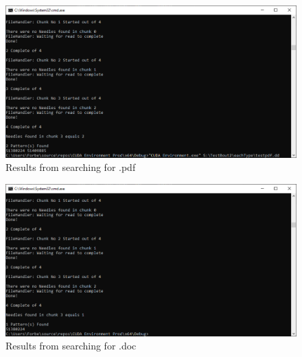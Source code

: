 \begin{figure}[!ht]
    \centering
    \includegraphics[width=\linewidth]{Images/Tests/64MB/PDFResults.png}
    \caption{Results from searching for .pdf}
    \label{appItem:PDFsearch}
\end{figure}
\newpage
\begin{figure}[!ht]
    \centering
    \includegraphics[width=\linewidth]{Images/Tests/64MB/DocResults.png}
    \caption{Results from searching for .doc}
    \label{appItem:DOCsearch}
\end{figure}
\newpage
